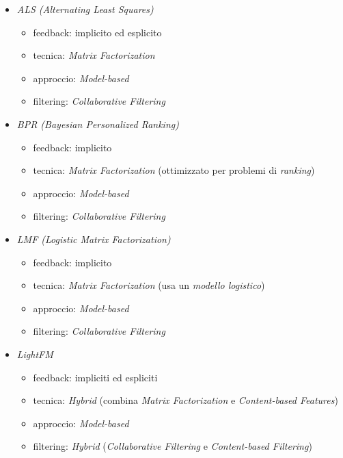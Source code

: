 \begin{itemize}[label=\textbullet]
    \item \textit{ALS (Alternating Least Squares)}
    \begin{itemize}
        \item feedback: implicito ed esplicito
        \item tecnica: \textit{Matrix Factorization}
        \item approccio: \textit{Model-based}
        \item filtering: \textit{Collaborative Filtering}
    \end{itemize}

    \item \textit{BPR (Bayesian Personalized Ranking)}
    \begin{itemize}
        \item feedback: implicito
        \item tecnica: \textit{Matrix Factorization} (ottimizzato per problemi di \textit{ranking})
        \item approccio: \textit{Model-based}
        \item filtering: \textit{Collaborative Filtering}
    \end{itemize}

    \item \textit{LMF (Logistic Matrix Factorization)}
    \begin{itemize}
        \item feedback: implicito
        \item tecnica: \textit{Matrix Factorization} (usa un \textit{modello logistico})
        \item approccio: \textit{Model-based}
        \item filtering: \textit{Collaborative Filtering}
    \end{itemize}

    \item \textit{LightFM}
    \begin{itemize}
        \item feedback: impliciti ed espliciti
        \item tecnica: \textit{Hybrid} (combina \textit{Matrix Factorization} e \textit{Content-based Features})
        \item approccio: \textit{Model-based}
        \item filtering: \textit{Hybrid} (\textit{Collaborative Filtering} e \textit{Content-based Filtering})
    \end{itemize}

\end{itemize}

